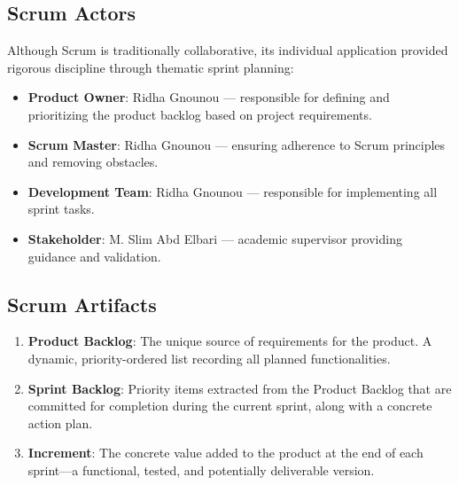 \subsection{Scrum Actors}

Although Scrum is traditionally collaborative, its individual application provided rigorous discipline through thematic sprint planning:

\begin{itemize}
    \item \textbf{Product Owner}: Ridha Gnounou — responsible for defining and prioritizing the product backlog based on project requirements.
    \item \textbf{Scrum Master}: Ridha Gnounou — ensuring adherence to Scrum principles and removing obstacles.
    \item \textbf{Development Team}: Ridha Gnounou — responsible for implementing all sprint tasks.
    \item \textbf{Stakeholder}: M. Slim Abd Elbari — academic supervisor providing guidance and validation.
\end{itemize}


\subsection{Scrum Artifacts}

\begin{enumerate}
    \item \textbf{Product Backlog}: The unique source of requirements for the product. A dynamic, priority-ordered list recording all planned functionalities.
    \item \textbf{Sprint Backlog}: Priority items extracted from the Product Backlog that are committed for completion during the current sprint, along with a concrete action plan.
    \item \textbf{Increment}: The concrete value added to the product at the end of each sprint—a functional, tested, and potentially deliverable version.
\end{enumerate}

